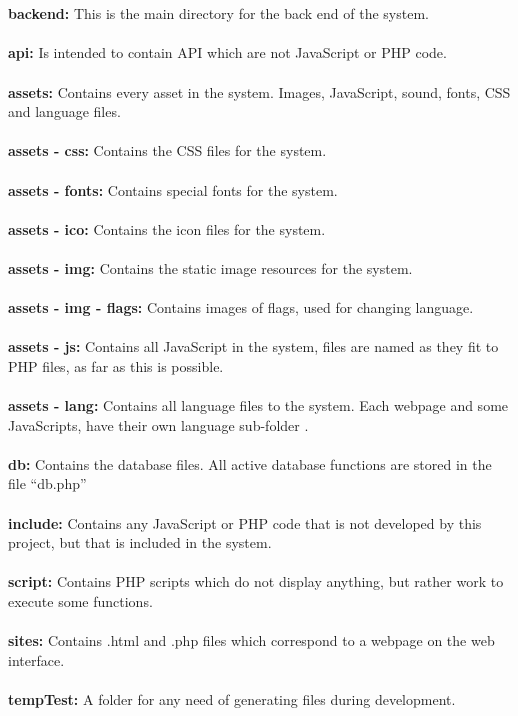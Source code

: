 \\
\\
\textbf{backend:} This is the main directory for the back end of the system.\\
\\
\textbf{api:} Is intended to contain API which are not JavaScript or PHP code.\\
\\
\textbf{assets:} Contains every asset in the system. Images, JavaScript, sound, fonts, CSS and language files.\\
\\
\textbf{assets - css:} Contains the CSS files for the system.\\
\\
\textbf{assets - fonts:} Contains special fonts for the system.\\
\\
\textbf{assets - ico:} Contains the icon files for the system.\\
\\
\textbf{assets - img:} Contains the static image resources for the system.\\
\\
\textbf{assets - img - flags:} Contains images of flags, used for changing language.\\
\\
\textbf{assets - js:} Contains all JavaScript in the system, files are named as they fit to PHP files, as far as this is possible.\\
\\
\textbf{assets - lang:} Contains all language files to the system. Each webpage and some JavaScripts, have their own language sub-folder .\\
\\
\textbf{db:} Contains the database files. All active database functions are stored in the file ``db.php''\\
\\
\textbf{include:} Contains any JavaScript or PHP code that is not developed by this project, but that is included in the system.\\
\\
\textbf{script:} Contains PHP scripts which do not display anything, but rather work to execute some functions.\\
\\
\textbf{sites:} Contains .html and .php files which correspond to a webpage on the web interface.\\
\\
\textbf{tempTest:} A folder for any need of generating files during development.


